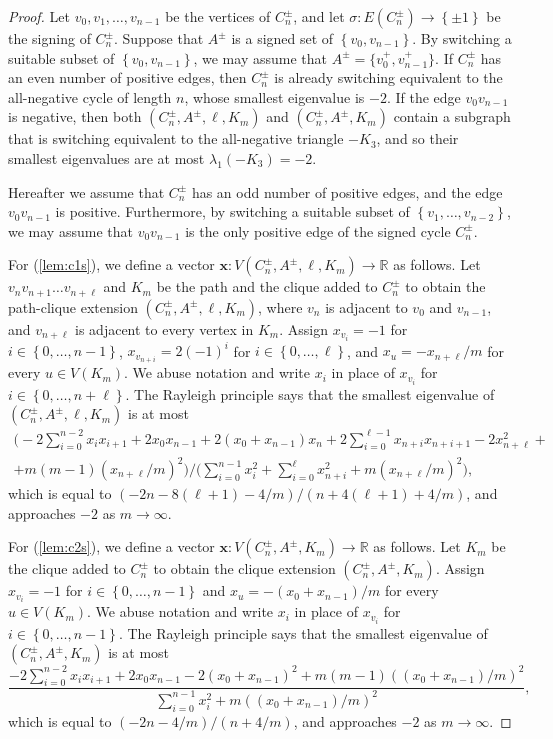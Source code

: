 \documentclass[11pt]{article}
\theoremstyle{definition}
\theoremstyle{remark}
\newcommand{\sset}[1]{\left\{{#1}\right\}}
\newcommand{\la}{\lambda}
\newcommand{\R}{\mathbb{R}}
\newcommand{\bx}{\bm{x}}
\begin{document}
\begin{proof}
    Let $v_0,v_1,\dots, v_{n-1}$ be the vertices of $C_n^\pm$, and let $\sigma\colon E(C^\pm_n) \to \sset{\pm 1}$ be the signing of $C^\pm_n$. Suppose that $A^\pm$ is a signed set of $\sset{v_0,v_{n-1}}$. By switching a suitable subset of $\sset{v_0, v_{n-1}}$, we may assume that $A^\pm = \{v_0^+, v_{n-1}^+\}$. If $C_n^\pm$ has an even number of positive edges, then $C^\pm_n$ is already switching equivalent to the all-negative cycle of length $n$, whose smallest eigenvalue is $-2$. If the edge $v_0v_{n-1}$ is negative, then both $(C_n^\pm, A^\pm, \ell, K_m)$ and $(C_n^\pm, A^\pm, K_m)$ contain a subgraph that is switching equivalent to the all-negative triangle $-K_3$, and so their smallest eigenvalues are at most $\la_1(-K_3) = -2$.

    Hereafter we assume that $C_n^\pm$ has an odd number of positive edges, and the edge $v_0v_{n-1}$ is positive. Furthermore, by switching a suitable subset of $\sset{v_1, \dots, v_{n-2}}$, we may assume that $v_0v_{n-1}$ is the only positive edge of the signed cycle $C_n^\pm$.

    For (\ref{lem:c1s}), we define a vector $\bx\colon V(C_n^\pm, A^\pm, \ell, K_m) \to \R$ as follows. Let $v_{n}v_{n+1}\dots v_{n+\ell}$ and $K_m$ be the path and the clique added to $C_n^\pm$ to obtain the path-clique extension $(C_n^\pm, A^\pm, \ell, K_m)$, where $v_{n}$ is adjacent to $v_0$ and $v_{n-1}$, and $v_{n+\ell}$ is adjacent to every vertex in $K_m$. Assign $x_{v_i} = -1$ for $i \in \sset{0, \dots, n-1}$, $x_{v_{n+i}} = 2(-1)^i$ for $i \in \sset{0, \dots, \ell}$, and $x_u = -x_{n+\ell}/m$ for every $u \in V(K_m)$. We abuse notation and write $x_i$ in place of $x_{v_i}$ for $i \in \sset{0, \dots, n+\ell}$. The Rayleigh principle says that the smallest eigenvalue of $(C_n^\pm, A^\pm, \ell, K_m)$ is at most
    \begin{multline*}
        \bigg(-2\sum_{i=0}^{n-2}x_ix_{i+1} + 2x_0x_{n-1} + 2(x_0 + x_{n-1})x_n + 2\sum_{i=0}^{\ell-1}x_{n+i}x_{n+i+1} - 2x_{n+\ell}^2 + \\
        + m(m-1)(x_{n+\ell}/m)^2\bigg) \bigg/ \bigg(\sum_{i=0}^{n-1} x_i^2 + \sum_{i=0}^\ell x_{n+i}^2 + m(x_{n+\ell}/m)^2\bigg),
    \end{multline*}
    which is equal to $(-2n - 8(\ell+1) - 4/m)/(n + 4(\ell+1) + 4/m)$, and approaches $-2$ as $m \to \infty$.

    For (\ref{lem:c2s}), we define a vector $\bx \colon V(C_n^\pm, A^\pm, K_m) \to \R$ as follows. Let $K_m$ be the clique added to $C_n^\pm$ to obtain the clique extension $(C_n^\pm, A^\pm, K_m)$. Assign $x_{v_i} = -1$ for $i \in \sset{0, \dots, n-1}$ and $x_u = -(x_0 + x_{n-1})/m$ for every $u \in V(K_m)$. We abuse notation and write $x_i$ in place of $x_{v_i}$ for $i \in \sset{0,\dots, n-1}$. The Rayleigh principle says that the smallest eigenvalue of $(C_n^\pm, A^\pm, K_m)$ is at most
    \[
        \frac{-2\sum_{i=0}^{n-2}x_ix_{i+1} + 2x_0x_{n-1} - 2(x_0 + x_{n-1})^2 + m(m-1)((x_0 + x_{n-1})/m)^2}{\sum_{i=0}^{n-1} x_i^2 + m((x_0 + x_{n-1})/m)^2},
    \]
    which is equal to $(-2n - 4/m)/(n + 4/m)$, and approaches $-2$ as $m \to \infty$.
\end{proof}
\end{document}
